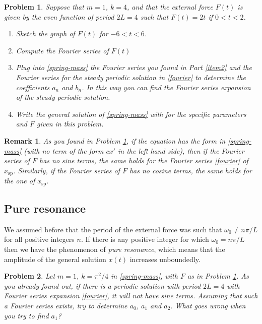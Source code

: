 \documentclass[11pt]{article}
\newcommand{\xsp}{x_{\mathrm{sp}}}
\newcommand{\w}{\omega}
\newtheorem{remark}{Remark}
\newtheorem{problem}{Problem}
\begin{document}
\begin{problem}\label{prob1}
    Suppose that $m=1$, $k=4$, and that the external force $F(t)$ is given by the even function of period $2L=4$ such that $F(t)=2t$ if $0<t<2$.
    \begin{enumerate}
        \item Sketch the graph of $F(t)$ for $-6<t<6$.
        \item Compute the Fourier series of $F(t)$\label{item2}
        \item Plug into \eqref{spring-mass} the Fourier series you found in Part \ref{item2} and the Fourier series for the steady periodic solution in \eqref{fourier} to determine the coefficients $a_n$ and $b_n$.
        In this way you can find the Fourier series expansion of the steady periodic solution.
        \item Write the general solution of \eqref{spring-mass} with for the specific parameters and $F$ given in this problem.
    \end{enumerate}
\end{problem}


\begin{remark}
    As you found in Problem \ref{prob1}, if the  equation has the form in \eqref{spring-mass} (with no term of the form $cx'$ in the left hand side), then if the Fourier series of $F$ has no sine terms, the same holds for the Fourier series \eqref{fourier} of $\xsp$. Similarly, if the Fourier series of $F$ has no cosine terms, the same holds for the one of $\xsp$.
\end{remark}


\subsection*{Pure resonance}
We assumed before that the period of the external force was such that $\w_0\neq n\pi/L$ for all positive integers $n$. If there is any positive integer for which $\w_0= n\pi/L$ then we have the phenomenon of \textit{pure resonance}, which means that the amplitude of the general solution $x(t)$ increases unboundedly.

\begin{problem}
    Let $m=1$, $k=\pi^2/4$ in \eqref{spring-mass}, with $F$ as in Problem \ref{prob1}.
    As you already found out, if there is a periodic solution with period $2L=4$ with Fourier series expansion \eqref{fourier}, it will not have sine terms. 
    Assuming that such a Fourier series exists, try to determine $a_0$, $a_1$ and $a_2$. What goes wrong when you try to find $a_1$?
\end{problem}
\end{document}
